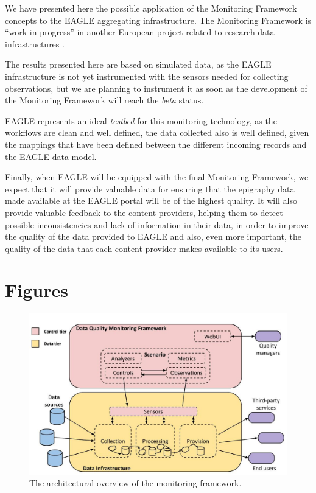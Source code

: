 \documentclass[amsthm,ebook]{saparticle}
\begin{document}
We have presented here the possible application of the Monitoring Framework concepts to the EAGLE aggregating infrastructure. The Monitoring Framework is ``work in progress'' in another European project related to research data infrastructures \citep{openaire}.

The results presented here are based on simulated data, as the EAGLE infrastructure is not yet instrumented with the sensors needed for collecting observations, but we are planning to instrument it as soon as the development of the Monitoring Framework will reach the \textit{beta} status. 

EAGLE represents an ideal \textit{testbed} for this monitoring technology, as the workflows are clean and well defined, the data collected also is well defined, given the mappings that have been defined between the different incoming records and the EAGLE data model. 

Finally, when EAGLE will be equipped with the final Monitoring Framework, we expect that it will provide valuable data for ensuring that the epigraphy data made available at the EAGLE portal will be of the highest quality. It will also provide valuable feedback to the content providers, helping them to detect possible inconsistencies and lack of information in their data, in order to improve the quality of the data provided to EAGLE and also, even more important, the quality of the data that each content provider makes available to its users.
\clearpage

\section{Figures}\label{sec:figures}
\begin{figure}[H]
\centering
\includegraphics[width=\textwidth]{img/arch.jpg}
\caption{The architectural overview of the monitoring framework.}
\label{fig:arch}
\end{figure}
\end{document}
